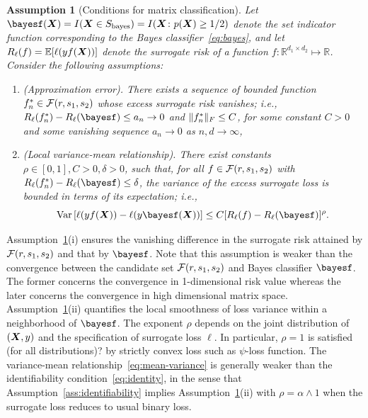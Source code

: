 \documentclass[12pt]{article}
\newtheorem{assumption}{Assumption}
\begin{document}
\begin{assumption}[Conditions for matrix classification]\label{ass:main} 
Let $\bayesf (\mX)= I(\mX\in S_{\text{bayes}}) =I(\mX\colon p(\mX)\geq 1/2)$ denote the set indicator function corresponding to the Bayes classifier~\eqref{eq:bayes}, and let $R_\ell(f)=\mathbb{E}[\ell(yf(\bm X))]$ denote the surrogate risk of a function $f\colon \mathbb{R}^{d_1\times d_2}\mapsto \mathbb{R}$. Consider the following assumptions:
\begin{enumerate}[wide, labelwidth=!, labelindent=0pt]
\item[(i)](Approximation error). There exists a sequence of bounded function $f_n^*\in\mathcal{F}(r,s_1,s_2)$ whose excess surrogate risk vanishes; i.e., $R_\ell(f^*_n)-R_\ell(\bayesf)\leq a_n\to 0$ and $\lVert f^*_n\rVert_F\leq C$, for some constant $C>0$ and some vanishing sequence $a_n\to 0$ as $n,d\to \infty$, 
\item[(ii)](Local variance-mean relationship). There exist constants $\rho\in[0,1], C>0, \delta >0$, such that, for all $f\in\mathcal{F}(r,s_1,s_2)$ with $R_\ell(f^*_n)-R_\ell(\bayesf) \leq \delta$, the variance of the excess surrogate loss is bounded in terms of its expectation; i.e.,
\begin{equation}\label{eq:mean-variance}
\text{Var}\left[\ell(yf(\mX))-\ell(y\bayesf(\mX))\right] \leq C[R_\ell(f)-R_\ell(\bayesf)]^\rho.
\end{equation}
\end{enumerate}
\end{assumption}


Assumption~\ref{ass:main}(i) ensures the vanishing difference in the surrogate risk attained by $\mathcal{F}(r,s_1,s_2)$ and that by $\bayesf$. Note that this assumption is weaker than the convergence between the candidate set $\mathcal{F}(r,s_1,s_2)$ and Bayes classifier $\bayesf$. The former concerns the convergence in 1-dimensional risk value whereas the later concerns the convergence in high dimensional matrix space. Assumption~\ref{ass:main}(ii) quantifies the local smoothness of loss variance within a neighborhood of $\bayesf$. The exponent $\rho$ depends on the joint distribution of $(\bm X,y)$ and the specification of surrogate loss $\ell$. In particular, $\rho=1$ is satisfied {\color{red}(for all distributions)?} by strictly convex loss such as $\psi$-loss function. The variance-mean relationship~\eqref{eq:mean-variance} is generally weaker than the identifiability condition~\eqref{eq:identity}, in the sense that Assumption~\ref{ass:identifiability} implies Assumption~\ref{ass:main}(ii) with $\rho=\alpha\wedge1$ when the surrogate loss reduces to usual binary loss. 
\end{document}
